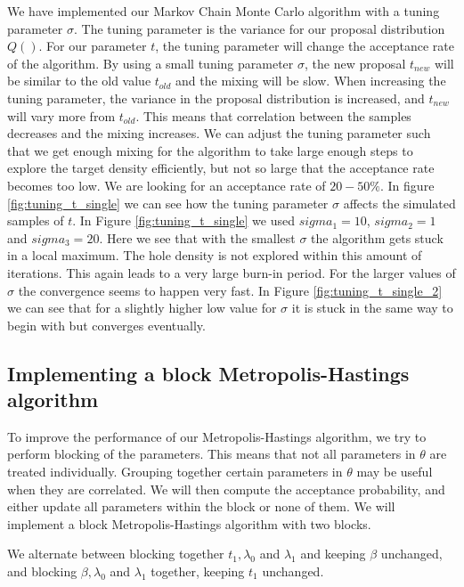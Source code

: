 We have implemented our Markov Chain Monte Carlo algorithm with a tuning parameter $\sigma$. The tuning parameter is the variance for our proposal distribution $Q()$. For our parameter $t$, the tuning parameter will change the acceptance rate of the algorithm. By using a small tuning parameter $\sigma$, the new proposal $t_{new}$ will be similar to the old value $t_{old}$ and the mixing will be slow. When increasing the tuning parameter, the variance in the proposal distribution is increased, and $t_{new}$ will vary more from $t_{old}$. This means that correlation between the samples decreases and the mixing increases. We can adjust the tuning parameter such that we get enough mixing for the algorithm to take large enough steps to explore the target density efficiently, but not so large that the acceptance rate becomes too low. We are looking for an acceptance rate of $20 - 50\%$. In figure \ref{fig:tuning_t_single} we can see how the tuning parameter $\sigma$ affects the simulated samples of $t$.  In Figure \ref{fig:tuning_t_single} we used $sigma_1 = 10$, $sigma_2 = 1$ and $sigma_3 = 20$. Here we see that with the smallest $\sigma$ the algorithm gets stuck in a local maximum. The hole density is not explored within this amount of iterations. This again leads to a very large burn-in period. For the larger values of $\sigma$ the convergence seems to happen very fast. 
In Figure \ref{fig:tuning_t_single_2} we can see that for a slightly higher low value for $\sigma$ it is stuck in the same way to begin with but converges eventually.

\subsection{Implementing a block Metropolis-Hastings algorithm}

To improve the performance of our Metropolis-Hastings algorithm, we try to perform blocking of the parameters. This means that not all parameters in $\theta$ are treated individually. Grouping together certain parameters in $\theta$ may be useful when they are correlated. We will then compute the acceptance probability, and either update all parameters within the block or none of them. We will implement a block Metropolis-Hastings algorithm with two blocks.


We alternate between blocking together $t_1, \lambda_0$ and  $ \lambda_1$ and keeping $\beta$ unchanged, and blocking $\beta, \lambda_0$ and $\lambda_1$ together, keeping $t_1$ unchanged.



